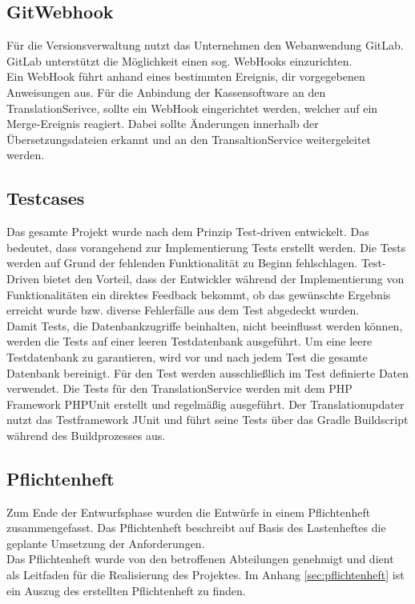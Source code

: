 \documentclass[10pt, oneside, ngerman]{article}
\begin{document}
  \subsection{GitWebhook}
      Für die Versionsverwaltung nutzt das Unternehmen den Webanwendung GitLab. GitLab unterstützt die Möglichkeit einen sog. WebHooks einzurichten.\\
      Ein WebHook führt anhand eines bestimmten Ereignis, dir vorgegebenen Anweisungen aus. Für die Anbindung der Kassensoftware an den TranslationSerivce, sollte ein
      WebHook eingerichtet werden, welcher auf ein Merge-Ereignis reagiert. Dabei sollte Änderungen innerhalb der Übersetzungsdateien erkannt und an den TransaltionService weitergeleitet werden.
  \subsection{Testcases}\label{sec:dr:tests}
      Das gesamte Projekt wurde nach dem Prinzip Test-driven entwickelt. Das bedeutet, dass vorangehend zur Implementierung Tests erstellt werden. Die Tests werden auf Grund der fehlenden 
      Funktionalität zu Beginn fehlschlagen. 
      Test-Driven bietet den Vorteil, dass der Entwickler während der Implementierung von Funktionalitäten ein direktes Feedback bekommt, ob das gewünschte Ergebnis erreicht wurde bzw.
      diverse Fehlerfälle aus dem Test abgedeckt wurden.\\
      Damit Tests, die Datenbankzugriffe beinhalten, nicht beeinflusst werden können, werden die Tests auf einer leeren Testdatenbank ausgeführt. Um eine leere Testdatenbank zu garantieren, 
      wird vor und nach jedem Test die gesamte Datenbank bereinigt. 
      Für den Test werden ausschließlich im Test definierte Daten verwendet.
      Die Tests für den TranslationService werden mit dem PHP Framework PHPUnit erstellt und regelmäßig ausgeführt. 
      Der Translationupdater nutzt das Testframework JUnit und führt seine Tests über das Gradle Buildscript während des Buildprozesses aus.
  \subsection{Pflichtenheft}
      Zum Ende der Entwurfsphase wurden die Entwürfe in einem Pflichtenheft zusammengefasst. Das Pflichtenheft beschreibt auf Basis des Lastenheftes
      die geplante Umsetzung der Anforderungen.\\
      Das Pflichtenheft wurde von den betroffenen Abteilungen genehmigt und dient als Leitfaden für die Realisierung des Projektes. 
      Im Anhang \ref{sec:pflichtenheft} ist ein Auszug des erstellten Pflichtenheft zu finden.
\end{document}
